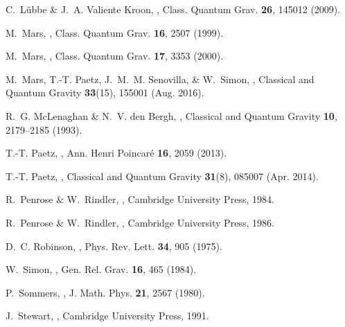 \documentclass[10pt,a4paper]{article}
\theoremstyle{plain}
\begin{document}
\begin{thebibliography}{10}
C.~L\"ubbe \& J.~A. {Valiente Kroon},
,
\newblock Class. Quantum Grav. {\bf 26}, 145012 (2009).

M.~Mars,
,
\newblock Class. Quantum Grav. {\bf 16}, 2507 (1999).

M.~Mars,
,
\newblock Class. Quantum Grav. {\bf 17}, 3353 (2000).

M.~{Mars}, T.-T. {Paetz}, J.~M.~M. {Senovilla}, \& W.~{Simon},
,
\newblock Classical and Quantum Gravity {\bf 33}(15), 155001 (Aug. 2016).

R.~G. McLenaghan \& N.~V. den Bergh,
,
\newblock Classical and Quantum Gravity {\bf 10}, 2179--2185 (1993).

T.-T. Paetz,
,
\newblock Ann. Henri Poincar\'{e} {\bf 16}, 2059 (2013).

T.-T. {Paetz},
,
\newblock Classical and Quantum Gravity {\bf 31}(8), 085007 (Apr. 2014).

R.~Penrose \& W.~Rindler,
,
\newblock Cambridge University Press, 1984.

R.~Penrose \& W.~Rindler,
,
\newblock Cambridge University Press, 1986.

D.~C. Robinson,
,
\newblock Phys. Rev. Lett. {\bf 34}, 905 (1975).

W.~Simon,
,
\newblock Gen. Rel. Grav. {\bf 16}, 465 (1984).

P.~Sommers,
,
\newblock J. Math. Phys. {\bf 21}, 2567 (1980).

J.~Stewart,
,
\newblock Cambridge University Press, 1991.


\end{thebibliography}
\end{document}
